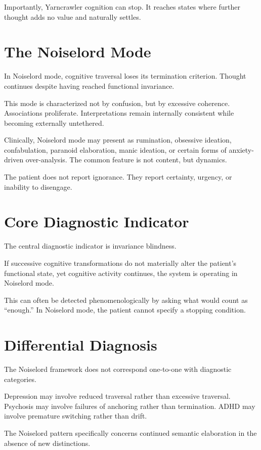 \documentclass[12pt]{article}
\begin{document}
Importantly, Yarncrawler cognition can stop. It reaches states where further thought adds no value and naturally settles.

\section{The Noiselord Mode}

In Noiselord mode, cognitive traversal loses its termination criterion. Thought continues despite having reached functional invariance.

This mode is characterized not by confusion, but by excessive coherence. Associations proliferate. Interpretations remain internally consistent while becoming externally untethered.

Clinically, Noiselord mode may present as rumination, obsessive ideation, confabulation, paranoid elaboration, manic ideation, or certain forms of anxiety-driven over-analysis. The common feature is not content, but dynamics.

The patient does not report ignorance. They report certainty, urgency, or inability to disengage.

\section{Core Diagnostic Indicator}

The central diagnostic indicator is invariance blindness.

If successive cognitive transformations do not materially alter the patient’s functional state, yet cognitive activity continues, the system is operating in Noiselord mode.

This can often be detected phenomenologically by asking what would count as “enough.” In Noiselord mode, the patient cannot specify a stopping condition.

\section{Differential Diagnosis}

The Noiselord framework does not correspond one-to-one with diagnostic categories.

Depression may involve reduced traversal rather than excessive traversal. Psychosis may involve failures of anchoring rather than termination. ADHD may involve premature switching rather than drift.

The Noiselord pattern specifically concerns continued semantic elaboration in the absence of new distinctions.
\end{document}
